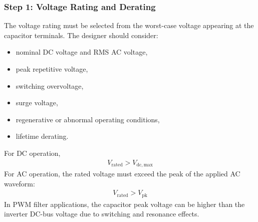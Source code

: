 \begin{frame}
\frametitle{Step 1: Voltage Rating and Derating}
The voltage rating must be selected from the worst-case voltage appearing at the capacitor terminals. The designer should consider:
\begin{itemize}
    \item nominal DC voltage and RMS AC voltage,
    \item peak repetitive voltage,
    \item switching overvoltage,
    \item surge voltage,
    \item regenerative or abnormal operating conditions,
    \item lifetime derating.
\end{itemize}
For DC operation,
\begin{align}
    V_{\mathrm{rated}} > V_{\mathrm{dc,max}}
\end{align}
For AC operation, the rated voltage must exceed the peak of the applied AC waveform:
\begin{align}
    V_{\mathrm{rated}} > V_{\mathrm{pk}}
\end{align}
In PWM filter applications, the capacitor peak voltage can be higher than the inverter DC-bus voltage due to switching and resonance effects.
\end{frame}


